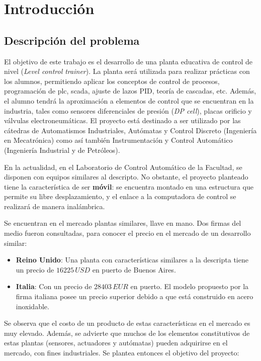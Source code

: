 \chapter{Introducción}
\label{ch:intro}

\section{Descripción del problema}
\label{sec:DescripcionProblema}
El objetivo de este trabajo es el desarrollo de una planta 
educativa de control de nivel
(\textit{Level control trainer}).
La planta será utilizada para realizar prácticas con los
alumnos, permitiendo aplicar los conceptos de
control de procesos, programación de \gls{plc}, \gls{scada},
ajuste de lazos PID, teoría de cascadas, etc.
Además, el alumno tendrá la aproximación a elementos de control que
se encuentran en la industria, tales como sensores diferenciales de presión
(\textit{DP cell}), placas orificio y válvulas electroneumáticas.
El proyecto está destinado a ser utilizado por las cátedras de
Automatismos Industriales, Autómatas y Control Discreto 
(Ingeniería en Mecatrónica)
como así también Instrumentación y Control Automático (Ingeniería Industrial
y de Petróleos).

En la actualidad, en el Laboratorio de Control Automático de la Facultad, 
se disponen con equipos similares al descripto.
No obstante, el proyecto planteado tiene la característica de ser 
\textbf{móvil}: se encuentra montado en una estructura que 
permite su libre desplazamiento, y el enlace a la
computadora de control se realizará de manera inalámbrica.

Se encuentran en el mercado plantas similares, llave en mano. 
Dos firmas del medio fueron consultadas, para conocer 
el precio en el mercado de un desarrollo similar:
\begin{itemize}
 \item \textbf{Reino Unido}: Una planta con características similares
 a la descripta tiene un precio de $16225\,USD$ en puerto de Buenos Aires.
 \item \textbf{Italia}: Con un precio de $28403\,EUR$ en puerto. 
 El modelo propuesto por la firma italiana
 posee un precio superior debido a que está construido en acero inoxidable.
\end{itemize}

Se observa que el costo de un producto de estas características en el mercado
es muy elevado.
Además, se advierte que muchos de los elementos constitutivos de estas plantas
(sensores, actuadores y autómatas) pueden adquirirse en el mercado, con fines
industriales.
Se plantea entonces el objetivo del proyecto:

